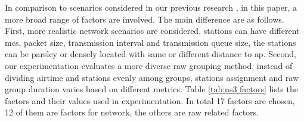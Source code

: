In comparison to scenarios considered in our previous research \cite{WoWMoM2016}, in this paper, a more broad range of factors are involved. The main difference are as follows. First, more realistic network scenarios are considered, stations can have different \gls{mcs}, packet size, transmission interval and transmission queue size, the stations can be parsley or densely located with same or different distance to \gls{ap}. Second, our experimentation evaluates a more diverse \gls{raw} grouping method, instead of dividing airtime and stations evenly among groups, stations assignment and \gls{raw} group duration varies based on different metrics. Table \ref{tab:ns3 factors} lists the factors and their values used in experimentation. In total 17 factors are chosen, 12 of them are factors for network, the others are \gls{raw} related factors.











